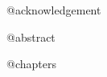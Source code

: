 \documentclass{report}
\begin{document}
\begin{coverpage}
\end{coverpage}

\begin{certificate}
\end{certificate}

\begin{acknowledgement}
@acknowledgement
\end{acknowledgement}

\begin{projectAbstract}
@abstract
\end{projectAbstract}




\newpage
\tableofcontents
\newpage

@chapters
\end{document}
